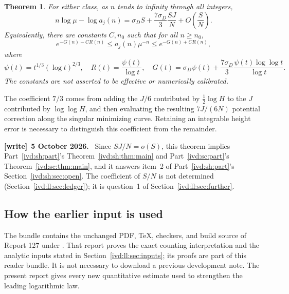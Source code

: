 \documentclass[11pt,letterpaper]{article}
\newtheorem{theorem}{Theorem}[section]
\theoremstyle{remark}\newtheorem{remark}[theorem]{Remark}
\numberwithin{equation}{section}
\newenvironment{writenote}[1][]{\par\smallskip\begingroup\small
 \noindent\textbf{[write]}\if\relax\detokenize{#1}\relax\else~\textbf{#1.}\fi\ }%
 {\par\endgroup\smallskip}
\begin{document}
\begin{theorem}\label{ivd:ll:thm:main}
For either class, as $n$ tends to infinity through all integers,
\begin{equation}\label{ivd:ll:eq:main}
 n\log\mu-\log a_j(n)
 =\sigma_D S+\frac{7\sigma_D}{3}\frac{SJ}{N}
                  +O\!\left(\frac SN\right).
\end{equation}
Equivalently, there are constants $C,n_0$ such that for all $n\ge n_0$,
\begin{equation}\label{ivd:ll:eq:envelopes}
 e^{-G(n)-C R(n)}\le a_j(n)\mu^{-n}\le e^{-G(n)+C R(n)},
\end{equation}
where
\[
 \psi(t)=t^{1/3}(\log t)^{2/3},\quad
 R(t)=\frac{\psi(t)}{\log t},\quad
 G(t)=\sigma_D\psi(t)+\frac{7\sigma_D}{3}
                  \frac{\psi(t)\log\log t}{\log t}.
\]
The constants are not asserted to be effective or numerically calibrated.
\end{theorem}
The coefficient $7/3$ comes from adding the $J/6$ contributed by
$\tfrac12\log H$ to the $J$ contributed by $\log\log H$, and
then evaluating the resulting $7J/(6N)$ potential correction along
the singular minimizing curve. Retaining an integrable height error
is necessary to distinguish this coefficient from the remainder.
\begin{writenote}[5 October 2026]
Since $SJ/N=o(S)$, this theorem implies Part~\ref{ivd:sh:part}'s Theorem~\ref{ivd:sh:thm:main} and Part~\ref{ivd:sc:part}'s Theorem~\ref{ivd:sc:thm:main}, and it answers item~2 of Part~\ref{ivd:sh:part}'s Section~\ref{ivd:sh:sec:open}. The coefficient of $S/N$ is not determined (Section~\ref{ivd:ll:sec:ledger}); it is question~1 of Section~\ref{ivd:ll:sec:further}.
\end{writenote}

\subsection{How the earlier input is used}\label{ivd:ll:sub:earlier}
The bundle contains the unchanged PDF, TeX, checkers, and build source
of Report 127 under . That report
proves the exact counting interpretation and the analytic inputs
stated in Section~\ref{ivd:ll:sec:inputs}; its proofs are part of this
reader bundle. It is not necessary to download a previous development
note. The present report gives every new quantitative estimate used
to strengthen the leading logarithmic law.
\end{document}
